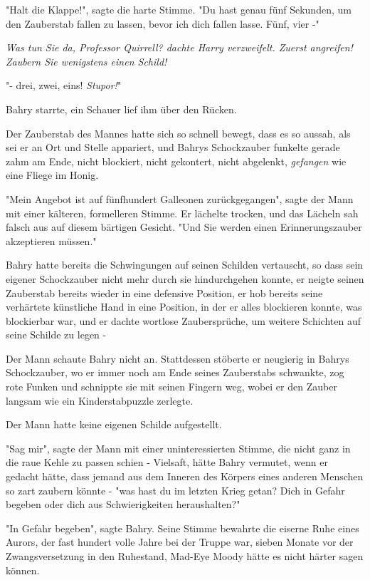 {"Halt die Klappe!", sagte die harte Stimme. "Du hast genau fünf Sekunden, um den Zauberstab fallen zu lassen, bevor ich dich fallen lasse. Fünf, vier -"

\emph{\emph{Was tun Sie da, Professor Quirrell?} dachte Harry verzweifelt. \emph{Zuerst angreifen!} \emph{Zaubern Sie} \emph{wenigstens einen Schild!}}

"- drei, zwei, eins! \emph{Stupor!}"

Bahry starrte, ein Schauer lief ihm über den Rücken.

Der Zauberstab des Mannes hatte sich so schnell bewegt, dass es so aussah, als sei er an Ort und Stelle appariert, und Bahrys Schockzauber funkelte gerade zahm am Ende, nicht blockiert, nicht gekontert, nicht abgelenkt, \emph{gefangen} wie eine Fliege im Honig.

"Mein Angebot ist auf fünfhundert Galleonen zurückgegangen", sagte der Mann mit einer kälteren, formelleren Stimme. Er lächelte trocken, und das Lächeln sah falsch aus auf diesem bärtigen Gesicht. "Und Sie werden einen Erinnerungszauber akzeptieren müssen."

Bahry hatte bereits die Schwingungen auf seinen Schilden vertauscht, so dass sein eigener Schockzauber nicht mehr durch sie hindurchgehen konnte, er neigte seinen Zauberstab bereits wieder in eine defensive Position, er hob bereits seine verhärtete künstliche Hand in eine Position, in der er alles blockieren konnte, was blockierbar war, und er dachte wortlose Zaubersprüche, um weitere Schichten auf seine Schilde zu legen -

Der Mann schaute Bahry nicht an. Stattdessen stöberte er neugierig in Bahrys Schockzauber, wo er immer noch am Ende seines Zauberstabs schwankte, zog rote Funken und schnippte sie mit seinen Fingern weg, wobei er den Zauber langsam wie ein Kinderstabpuzzle zerlegte.

Der Mann hatte keine eigenen Schilde aufgestellt.

"Sag mir", sagte der Mann mit einer uninteressierten Stimme, die nicht ganz in die raue Kehle zu passen schien - Vielsaft, hätte Bahry vermutet, wenn er gedacht hätte, dass jemand aus dem Inneren des Körpers eines anderen Menschen so zart zaubern könnte - "was hast du im letzten Krieg getan? Dich in Gefahr begeben oder dich aus Schwierigkeiten heraushalten?"

"In Gefahr begeben", sagte Bahry. Seine Stimme bewahrte die eiserne Ruhe eines Aurors, der fast hundert volle Jahre bei der Truppe war, sieben Monate vor der Zwangsversetzung in den Ruhestand, Mad-Eye Moody hätte es nicht härter sagen können.

}
